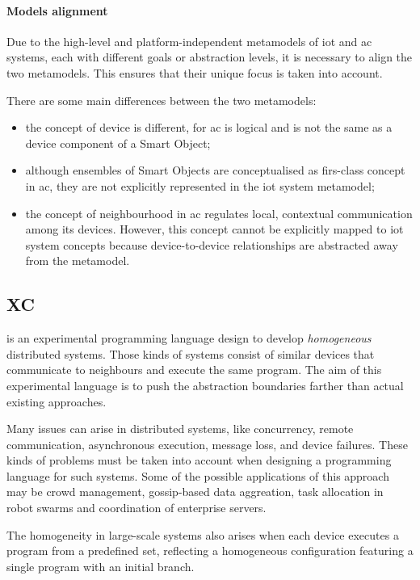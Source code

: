 \paragraph{Models alignment}
Due to the high-level and platform-independent metamodels of \ac{iot} and \ac{ac} systems, each with different goals or
abstraction levels, it is necessary to align the two metamodels.
This ensures that their unique focus is taken into account.

There are some main differences between the two metamodels:
\begin{itemize}
    \item the concept of device is different, for \ac{ac} is logical and is not the same as a device component of a Smart Object;
    \item although ensembles of Smart Objects are conceptualised as firs-class concept in \ac{ac}, they are not explicitly
        represented in the \ac{iot} system metamodel;
    \item the concept of neighbourhood in \ac{ac} regulates local, contextual communication among its devices.
        However, this concept cannot be explicitly mapped to \ac{iot} system concepts because device-to-device relationships
        are abstracted away from the metamodel.
\end{itemize}

\subsection{XC}
\label{subsec:xc}
\xc{} is an experimental programming language design to develop \emph{homogeneous} distributed systems.
Those kinds of systems consist of similar devices that communicate to neighbours and execute the same program.
The aim of this experimental language is to push the abstraction boundaries farther than actual existing approaches.

Many issues can arise in distributed systems, like concurrency, remote communication, asynchronous execution, message
loss, and device failures.
These kinds of problems must be taken into account when designing a programming language for such systems.
Some of the possible applications of this approach may be crowd management, gossip-based data aggreation, task allocation
in robot swarms and coordination of enterprise servers. %

The homogeneity in large-scale systems also arises when each device executes a program from a predefined set, reflecting
a homogeneous configuration featuring a single program with an initial branch.

